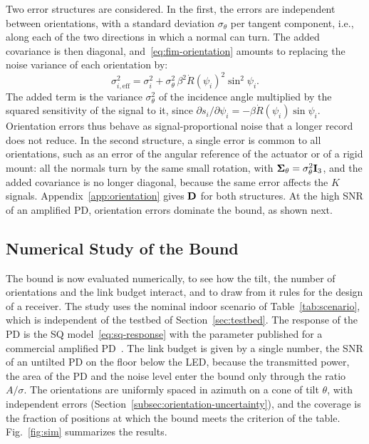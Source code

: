 Two error structures are considered. In the first, the errors are independent between orientations, with a standard deviation $\sigma_\theta$ per tangent component, i.e., along each of the two directions in which a normal can turn. The added covariance is then diagonal, and~\eqref{eq:fim-orientation} amounts to replacing the noise variance of each orientation by:
\begin{equation}
 {\sigma_{i,\mathrm{eff}}^2=\sigma_i^2}+\sigma_\theta^2\,\beta^2\dot R(\psi_i)^2\sin^2\psi_i.
 \label{eq:effective-variance}
\end{equation}
The added term is the variance $\sigma_\theta^2$ of the incidence angle multiplied by the squared sensitivity of the signal to it, since $\partial s_i/\partial\psi_i=-\beta\dot R(\psi_i)\sin\psi_i$. Orientation errors thus behave as signal-proportional noise that a longer record does not reduce. In the second structure, a single error is common to all orientations, such as an error of the angular reference of the actuator or of a rigid mount: all the normals turn by the same small rotation, with $\bm\Sigma_\theta=\sigma_\theta^2\mathbf{I}_3$, and the added covariance is no longer diagonal, because the same error affects the $K$ signals. Appendix~\ref{app:orientation} gives $\mathbf{D}$ for both structures. At the high SNR of an amplified PD, orientation errors dominate the bound, as shown next.

\subsection{Numerical Study of the Bound}
\label{subsec:design}
The bound is now evaluated numerically, to see how the tilt, the number of orientations and the link budget interact, and to draw from it rules for the design of a receiver. The study uses the nominal indoor scenario of Table~\ref{tab:scenario}, which is independent of the testbed of Section~\ref{sec:testbed}. The response of the PD is the SQ model~\eqref{eq:sq-response} with the parameter published for a commercial amplified PD~\cite{Bastiaens2020}. The link budget is given by a single number, the SNR of an untilted PD on the floor below the LED, because the transmitted power, the area of the PD and the noise level enter the bound only through the ratio $A/\sigma$. The orientations are uniformly spaced in azimuth on a cone of tilt $\theta$, with independent errors (Section~\ref{subsec:orientation-uncertainty}), and the coverage is the fraction of positions at which the bound meets the criterion of the table. Fig.~\ref{fig:sim} summarizes the results.


